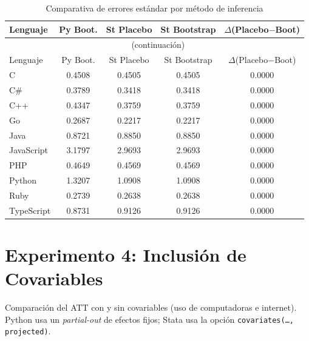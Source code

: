 \documentclass[12pt,a4paper]{article}
\begin{document}
\begin{longtable}{lcccc}
\caption{Comparativa de errores est\'andar por m\'etodo de inferencia} \\
\toprule
Lenguaje & \textcolor{pyblue}{Py Boot.} & \textcolor{statagreen}{St Placebo} & \textcolor{statagreen}{St Bootstrap} & $\Delta$(Placebo$-$Boot) \\
\midrule
\endfirsthead
\multicolumn{5}{c}{\tablename\ \thetable{} (continuaci\'on)} \\ \toprule
Lenguaje & \textcolor{pyblue}{Py Boot.} & \textcolor{statagreen}{St Placebo} & \textcolor{statagreen}{St Bootstrap} & $\Delta$(Placebo$-$Boot) \\
\midrule \endhead \bottomrule \endfoot
  C & 0.4508 & 0.4505 & 0.4505 & 0.0000 \\
  C\# & 0.3789 & 0.3418 & 0.3418 & 0.0000 \\
  C++ & 0.4347 & 0.3759 & 0.3759 & 0.0000 \\
  Go & 0.2687 & 0.2217 & 0.2217 & 0.0000 \\
  Java & 0.8721 & 0.8850 & 0.8850 & 0.0000 \\
  JavaScript & 3.1797 & 2.9693 & 2.9693 & 0.0000 \\
  PHP & 0.4649 & 0.4569 & 0.4569 & 0.0000 \\
  Python & 1.3207 & 1.0908 & 1.0908 & 0.0000 \\
  Ruby & 0.2739 & 0.2638 & 0.2638 & 0.0000 \\
  TypeScript & 0.8731 & 0.9126 & 0.9126 & 0.0000 \\
\end{longtable}

\section{Experimento 4: Inclusi\'on de Covariables}

Comparaci\'on del ATT con y sin covariables (uso de computadoras e internet).
Python usa un \textit{partial-out} de efectos fijos; Stata usa la opci\'on
\texttt{covariates(\ldots, projected)}.
\end{document}
